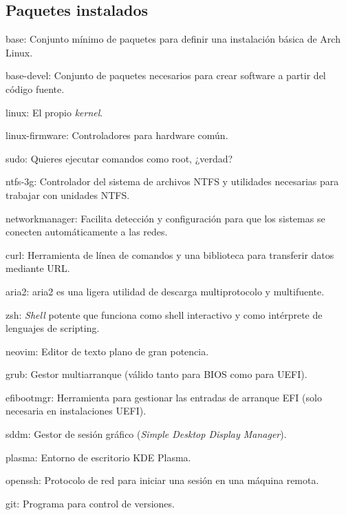 \subsection{Paquetes instalados}
\begin{tcolorbox}[title=\faExclamation\hspace*{1em} Explicación de los paquetes instalados]

  \small
  \begin{paquetes}
    \item[base:] Conjunto mínimo de paquetes para definir una instalación básica de Arch Linux.
    \item[base-devel:] Conjunto de paquetes necesarios para crear software a partir del código fuente.
    \item[linux:] El propio \textit{kernel}.
    \item[linux-firmware:] Controladores para hardware común.
    \item[sudo:]  Quieres ejecutar comandos como root, ¿verdad?
    \item[ntfs-3g:]  Controlador del sistema de archivos NTFS y utilidades necesarias para trabajar con unidades NTFS.
    \item[networkmanager:] Facilita detección y configuración para que los sistemas se conecten automáticamente a las redes.
    \item[curl:] Herramienta de línea de comandos y una biblioteca para transferir datos mediante URL.
    \item[aria2:] aria2 es una ligera utilidad de descarga multiprotocolo y multifuente.
    \item[zsh:] \textit{Shell} potente que funciona como shell interactivo y como intérprete de lenguajes de scripting.
    \item[neovim:] Editor de texto plano de gran potencia.
    \item[grub:] Gestor multiarranque (válido tanto para BIOS como para UEFI).
    \item[efibootmgr:] Herramienta para gestionar las entradas de arranque EFI (solo necesaria en instalaciones UEFI).
    \item[sddm:] Gestor de sesión gráfico (\textit{Simple Desktop Display Manager}).
    \item[plasma:] Entorno de escritorio KDE Plasma.
    \item[openssh:] Protocolo de red para iniciar una sesión en una máquina remota.
    \item[git:] Programa para control de versiones.
  \end{paquetes}
\end{tcolorbox}
\newpage
